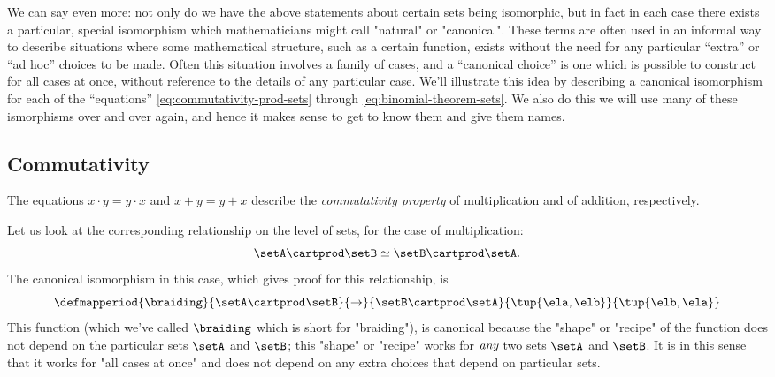 
We can say even more: not only do we have the above statements about certain sets being isomorphic, but in fact in each case there exists a particular, special isomorphism which mathematicians might call "natural" or "canonical". These terms are often used in an informal way to describe situations where some mathematical structure, such as a certain function, exists without the need for any particular ``extra'' or ``ad hoc'' choices to be made. Often this situation involves a family of cases, and a ``canonical choice'' is one which is possible to construct for all cases at once, without reference to the details of any particular case. We'll illustrate this idea by describing a canonical isomorphism for each of the ``equations'' \cref{eq:commutativity-prod-sets} through \cref{eq:binomial-theorem-sets}. We also do this we will use many of these ismorphisms over and over again, and hence it makes sense to get to know them and give them names. 

\subsection{Commutativity}
   
The equations $x \cdot y = y \cdot x$ and $x + y = y + x$ describe the \emph{commutativity property} of multiplication and of addition, respectively. 

Let us look at the corresponding relationship on the level of sets, for the case of multiplication:
\begin{equation}
\setA \cartprod \setB \simeq \setB \cartprod \setA. 
\end{equation}
The canonical isomorphism in this case, which gives proof for this relationship, is
 \begin{equation}
 \defmapperiod{
           \braiding
        }{
            \setA \cartprod \setB
        }{
            \to
        }{
            \setB \cartprod \setA
        }{
            \tup{\ela, \elb}
        }{
            \tup{\elb, \ela}
        }
\end{equation}
This function (which we've called $\braiding$ which is short for "braiding"), is canonical because the "shape" or "recipe" of the function does not depend on the particular sets $\setA$ and $\setB$; this "shape" or "recipe" works for $\emph{any}$ two sets $\setA$ and $\setB$. It is in this sense that it works for "all cases at once" and does not depend on any extra choices that depend on particular sets.


